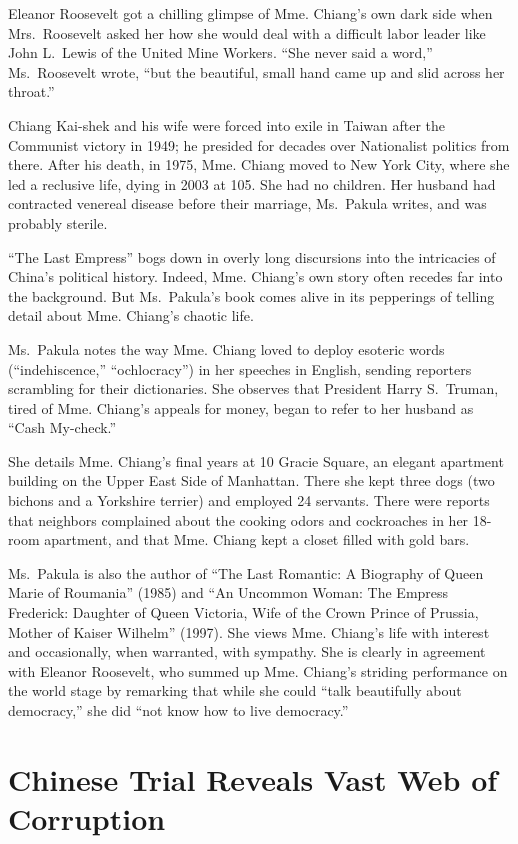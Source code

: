 ﻿\documentclass[12pt]{article}
\begin{document}
Eleanor Roosevelt got a chilling glimpse of Mme. Chiang's own dark side when Mrs.~Roosevelt asked
her how she would deal with a difficult labor leader like John L.~Lewis of the United Mine Workers.
``She never said a word,'' Ms.~Roosevelt wrote, ``but the beautiful, small hand came up and slid
across her throat.''

Chiang Kai-shek and his wife were forced into exile in Taiwan after the Communist victory in 1949;
he presided for decades over Nationalist politics from there. After his death, in 1975, Mme. Chiang
moved to New York City, where she led a reclusive life, dying in 2003 at 105. She had no children.
Her husband had contracted venereal disease before their marriage, Ms.~Pakula writes, and was
probably sterile.

``The Last Empress'' bogs down in overly long discursions into the intricacies of China's political
history. Indeed, Mme. Chiang's own story often recedes far into the background. But Ms.~Pakula's
book comes alive in its pepperings of telling detail about Mme. Chiang's chaotic life.

Ms.~Pakula notes the way Mme. Chiang loved to deploy esoteric words (``indehiscence,''
``ochlocracy'') in her speeches in English, sending reporters scrambling for their dictionaries. She
observes that President Harry S.~Truman, tired of Mme. Chiang's appeals for money, began to refer to
her husband as ``Cash My-check.''

She details Mme. Chiang's final years at 10 Gracie Square, an elegant apartment building on the
Upper East Side of Manhattan. There she kept three dogs (two bichons and a Yorkshire terrier) and
employed 24 servants. There were reports that neighbors complained about the cooking odors and
cockroaches in her 18-room apartment, and that Mme. Chiang kept a closet filled with gold bars.

Ms.~Pakula is also the author of ``The Last Romantic: A Biography of Queen Marie of Roumania''
(1985) and ``An Uncommon Woman: The Empress Frederick: Daughter of Queen Victoria, Wife of the Crown
Prince of Prussia, Mother of Kaiser Wilhelm'' (1997). She views Mme. Chiang's life with interest and
occasionally, when warranted, with sympathy. She is clearly in agreement with Eleanor Roosevelt, who
summed up Mme. Chiang's striding performance on the world stage by remarking that while she could
``talk beautifully about democracy,'' she did ``not know how to live democracy.''

\section{Chinese Trial Reveals Vast Web of Corruption}
\end{document}
